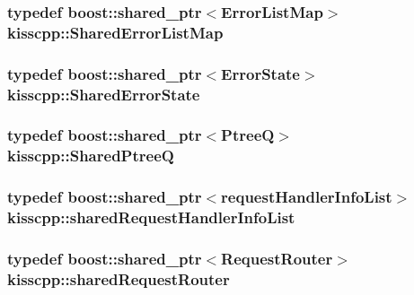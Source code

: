 \hypertarget{namespacekisscpp_a52b7a11959a119c1da931042d7751db0}{
\subsubsection[{Shared\-Error\-List\-Map}]{\setlength{\rightskip}{0pt plus 5cm}typedef boost\-::shared\-\_\-ptr$<${\bf Error\-List\-Map}$>$ {\bf kisscpp\-::\-Shared\-Error\-List\-Map}}}\label{namespacekisscpp_a52b7a11959a119c1da931042d7751db0}
\hypertarget{namespacekisscpp_af77de115307b379cbcab83a1fc54fdad}{
\subsubsection[{Shared\-Error\-State}]{\setlength{\rightskip}{0pt plus 5cm}typedef boost\-::shared\-\_\-ptr$<${\bf Error\-State}$>$ {\bf kisscpp\-::\-Shared\-Error\-State}}}\label{namespacekisscpp_af77de115307b379cbcab83a1fc54fdad}
\hypertarget{namespacekisscpp_aecf9f29bb4c41e0d4dbc74731a3020cd}{
\subsubsection[{Shared\-Ptree\-Q}]{\setlength{\rightskip}{0pt plus 5cm}typedef boost\-::shared\-\_\-ptr$<${\bf Ptree\-Q}$>$ {\bf kisscpp\-::\-Shared\-Ptree\-Q}}}\label{namespacekisscpp_aecf9f29bb4c41e0d4dbc74731a3020cd}
\hypertarget{namespacekisscpp_aa107348bd263ff2c9358b497155d37b8}{
\subsubsection[{shared\-Request\-Handler\-Info\-List}]{\setlength{\rightskip}{0pt plus 5cm}typedef boost\-::shared\-\_\-ptr$<${\bf request\-Handler\-Info\-List}$>$ {\bf kisscpp\-::shared\-Request\-Handler\-Info\-List}}}\label{namespacekisscpp_aa107348bd263ff2c9358b497155d37b8}
\hypertarget{namespacekisscpp_a203bb476deb3940ecd3f21668dd3cdff}{
\subsubsection[{shared\-Request\-Router}]{\setlength{\rightskip}{0pt plus 5cm}typedef boost\-::shared\-\_\-ptr$<${\bf Request\-Router}$>$ {\bf kisscpp\-::shared\-Request\-Router}}}\label{namespacekisscpp_a203bb476deb3940ecd3f21668dd3cdff}
